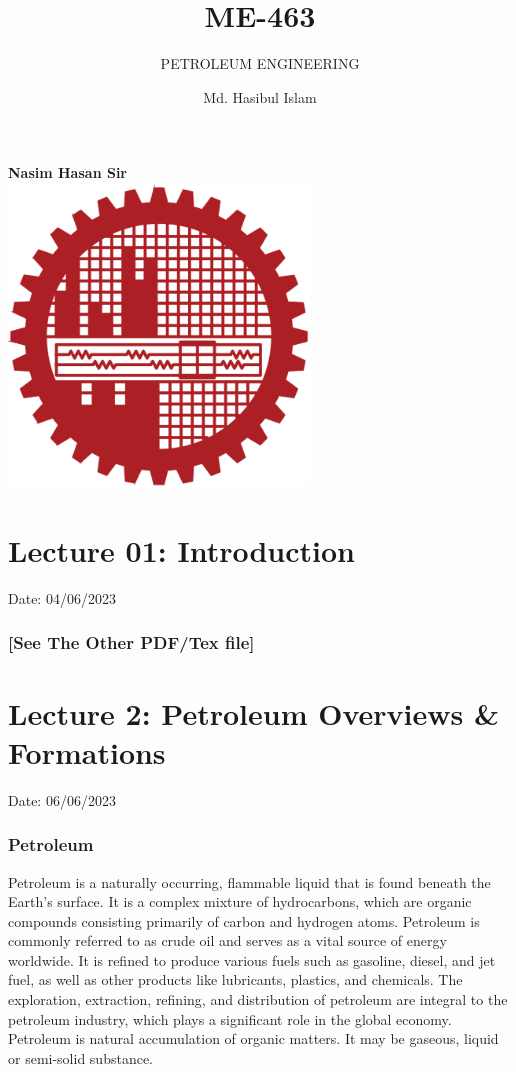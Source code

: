 \documentclass{article}
\title{ME-463}
\author{Md. Hasibul Islam}
\subtitle{PETROLEUM ENGINEERING}
\begin{document}
\begin{titlepage}
    \centering
    
    {\Huge\bfseries\maketitle}
    \textbf{Nasim Hasan Sir} \\
    \vspace{2cm}
    \includegraphics[width=8cm]{institution_logo.jpg}
    \vfill
\end{titlepage}

\tableofcontents
\pagebreak

\section{Lecture 01: Introduction} 
\hfill Date: 04/06/2023
\subsubsection*{[See The Other PDF/Tex file]}

\section{Lecture 2: Petroleum Overviews \& Formations} 
\hfill Date: 06/06/2023

\subsubsection*{Petroleum}
Petroleum is a naturally occurring, flammable liquid that is found beneath the Earth's surface. It is a complex mixture of hydrocarbons, which are organic compounds consisting primarily of carbon and hydrogen atoms. Petroleum is commonly referred to as crude oil and serves as a vital source of energy worldwide. It is refined to produce various fuels such as gasoline, diesel, and jet fuel, as well as other products like lubricants, plastics, and chemicals. The exploration, extraction, refining, and distribution of petroleum are integral to the petroleum industry, which plays a significant role in the global economy.\\
Petroleum is natural accumulation of organic matters. It may be gaseous, liquid or semi-solid substance. 
\end{document}
